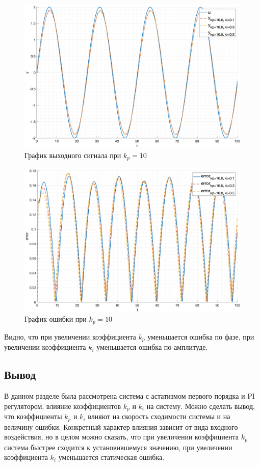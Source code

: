 \begin{figure}[ht!]
    \centering
    \includegraphics[width=\textwidth]{media/plots/task5_out_kp_10.0_2.png}
    \caption{График выходного сигнала при $k_p = 10$}
    \label{fig:task5_out6}
\end{figure}

\begin{figure}[ht!]
    \centering
    \includegraphics[width=\textwidth]{media/plots/task5_error_kp_10.0_2.png}
    \caption{График ошибки при $k_p = 10$}
    \label{fig:task5_error6}
\end{figure}

Видно, что при увеличении коэффициента $k_p$ уменьшается ошибка 
по фазе, при увеличении коэффициента $k_i$ уменьшается ошибка по амплитуде. 

\subsection{Вывод}

В данном разделе была рассмотрена система с астатизмом первого порядка и PI регулятором, 
влияние коэффициентов $k_p$ и $k_i$ на систему.
Можно сделать вывод, что коэффициенты $k_p$ и $k_i$ влияют на скорость сходимости системы и на величину ошибки.
Конкретный характер влияния зависит от вида входного воздействия, но в целом можно сказать, 
что при увеличении коэффициента $k_p$ система быстрее сходится к установившемуся значению,
при увеличении коэффициента $k_i$ уменьшается статическая ошибка. 

